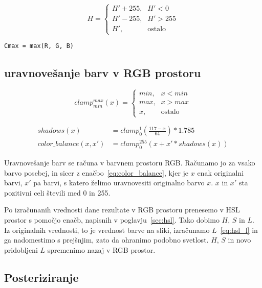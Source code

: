 \begin{equation}
H =
\begin{cases}
    H' + 255 \text{,}& H' < 0 \\
    H' - 255 \text{,}& H' > 255 \\
    H' \text{,}& \text{ostalo}
\end{cases}
\end{equation}

\begin{lstlisting}[caption=algoritem]
Cmax = max(R, G, B)

\end{lstlisting}

\subsection{uravnovešanje barv v RGB prostoru}

\begin{equation}
clamp_{min}^{max}(x) =
\begin{cases}
    min \text{,}& x < min \\
    max \text{,}& x > max \\
    x \text{,}& \text{ostalo}
\end{cases}
\end{equation}

\begin{align}
shadows(x) &= clamp_{0}^{1}(\frac{117 - x}{64}) * 1.785 \\
color\_balance(x, x') &= clamp_{0}^{255}(x + x' * shadows(x)) \label{eq:color_balance}
\end{align}

Uravnovešanje barv se računa v barvnem prostoru RGB. Računamo jo za vsako
barvo posebej, in sicer z enačbo~\eqref{eq:color_balance}, kjer je $x$ enak
originalni barvi, $x'$ pa barvi, s katero želimo uravnovesiti originalno barvo
$x$. $x$ in $x'$ sta pozitivni celi števili med 0 in 255.

Po izračunanih vrednosti dane rezultate v RGB prostoru prenesemo v HSL prostor
s pomočjo enačb, napisnih v poglavju~\ref{sec:hsl}. Tako dobimo $H$, $S$ in
$L$. Iz originalnih vrednosti, to je vrednost barve na sliki, izračunamo
$L$~\ref{eq:hsl_l} in ga nadomestimo s prejšnjim, zato da ohranimo podobno
svetlost. $H$, $S$ in novo pridobljeni $L$ spremenimo nazaj v RGB prostor.

\subsection{Posteriziranje}

